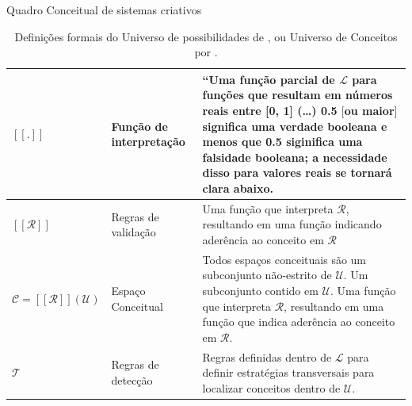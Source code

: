 \documentclass[aspectratio=169]{beamer}
\begin{document}
\begin{frame}{Quadro Conceitual de sistemas criativos}  
\begin{table}[!h]
\caption{Definições formais do Universo de possibilidades de , ou Universo de Conceitos por .}
\small
    \begin{tabular}{ | p{3.25cm} | p{4.25cm} | p{4.25cm} |}
    \hline 
    \hline 

    $[[.]]$
    & \tiny{Função de interpretação} 
    & \tiny{``Uma função parcial de $\mathcal{L}$ para funções que resultam em números reais entre [0, 1] (\ldots) 0.5 $[$ou maior$]$ significa uma verdade booleana e menos que 0.5 siginifica uma falsidade booleana; a necessidade disso para valores reais se tornará clara abaixo. }\\
    \hline

     $[[\mathcal{R}]]$
    & \tiny{Regras de validação} 
    & \tiny{Uma função que interpreta $\mathcal{R}$, resultando em uma função indicando aderência ao conceito em $\mathcal{R}$} \\
    \hline

     $\mathcal{C} = [[\mathcal{R}]](\mathcal{U}) $
    & \tiny{Espaço Conceitual} 
    & \tiny{Todos espaços conceituais são um subconjunto não-estrito de $\mathcal{U}$. Um subconjunto contido em $\mathcal{U}$. Uma função que interpreta $\mathcal{R}$, resultando em uma função que indica aderência ao conceito em $\mathcal{R}$. } \\
    \hline

    $\mathcal{T}$
    & \tiny{Regras de detecção} 
    & \tiny{Regras definidas dentro de $\mathcal{L}$ para definir estratégias transversais para localizar conceitos dentro de $\mathcal{U}$.} \\
    \hline
    \hline
   
    \end{tabular}
\label{tab:universodeconceitos}
\end{table}
\end{frame}
\end{document}
